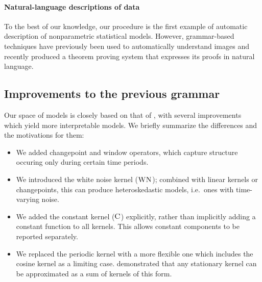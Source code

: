 \documentclass[letterpaper]{article}
\newcommand{\procedurename}{ABCDE}
\begin{document}


\paragraph{Natural-language descriptions of data}

To the best of our knowledge, our procedure is the first example of automatic description of nonparametric statistical models.
However, grammar-based techniques have previously been used to automatically understand images \cite{zhu2007stochastic} and recently \citet{GanesalingamG13} produced a theorem proving system that expresses its proofs in natural language.

\subsection{Improvements to the previous grammar}

Our space of \gp{} models is closely based on that of \citet{DuvLloGroetal13}, with several improvements which yield more interpretable models. We briefly summarize the differences and the motivations for them:
\begin{itemize}
\item We added changepoint and window operators, which capture structure occuring only during certain time periods.
\item We introduced the white noise kernel (${\textsc{WN}}$); combined with linear kernels or changepoints, this can produce heteroskedastic models, i.e.~ones with time-varying noise.
\item We added the constant kernel (${\textsc{C}}$) explicitly, rather than implicitly adding a constant function to all kernels. This allows constant components to be reported separately.%
\item We replaced the periodic kernel with a more flexible one which includes the cosine kernel as a limiting case. \citet{bochner1959lectures} demonstrated that any stationary kernel can be approximated as a sum of kernels of this form.
\end{itemize}
\end{document}
